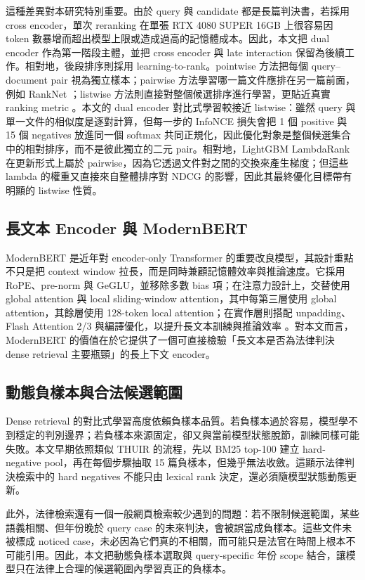 這種差異對本研究特別重要。由於 query 與 candidate 都是長篇判決書，若採用 cross encoder，單次 reranking 在單張 RTX 4080 SUPER 16GB 上很容易因 token 數暴增而超出模型上限或造成過高的記憶體成本。因此，本文把 dual encoder 作為第一階段主體，並把 cross encoder 與 late interaction 保留為後續工作。相對地，後段排序則採用 learning-to-rank。pointwise 方法把每個 query--document pair 視為獨立樣本；pairwise 方法學習哪一篇文件應排在另一篇前面，例如 RankNet \cite{burges2005ranknet}；listwise 方法則直接對整個候選排序進行學習，更貼近真實 ranking metric \cite{cao2007listnet,liu2009ltr}。本文的 dual encoder 對比式學習較接近 listwise：雖然 query 與單一文件的相似度是逐對計算，但每一步的 InfoNCE 損失會把 1 個 positive 與 15 個 negatives 放進同一個 softmax 共同正規化，因此優化對象是整個候選集合中的相對排序，而不是彼此獨立的二元 pair。相對地，LightGBM LambdaRank 在更新形式上屬於 pairwise，因為它透過文件對之間的交換來產生梯度；但這些 lambda 的權重又直接來自整體排序對 NDCG 的影響，因此其最終優化目標帶有明顯的 listwise 性質。

\subsection{長文本 Encoder 與 ModernBERT}

ModernBERT \cite{warner2024modernbert} 是近年對 encoder-only Transformer 的重要改良模型，其設計重點不只是把 context window 拉長，而是同時兼顧記憶體效率與推論速度。它採用 RoPE、pre-norm 與 GeGLU，並移除多數 bias 項；在注意力設計上，交替使用 global attention 與 local sliding-window attention，其中每第三層使用 global attention，其餘層使用 128-token local attention；在實作層則搭配 unpadding、Flash Attention 2/3 與編譯優化，以提升長文本訓練與推論效率 \cite{warner2024modernbert}。對本文而言，ModernBERT 的價值在於它提供了一個可直接檢驗「長文本是否為法律判決 dense retrieval 主要瓶頸」的長上下文 encoder。

\subsection{動態負樣本與合法候選範圍}

Dense retrieval 的對比式學習高度依賴負樣本品質。若負樣本過於容易，模型學不到穩定的判別邊界；若負樣本來源固定，卻又與當前模型狀態脫節，訓練同樣可能失敗。本文早期依照類似 THUIR 的流程，先以 BM25 top-100 建立 hard-negative pool，再在每個步驟抽取 15 篇負樣本，但幾乎無法收斂。這顯示法律判決檢索中的 hard negatives 不能只由 lexical rank 決定，還必須隨模型狀態動態更新。

此外，法律檢索還有一個一般網頁檢索較少遇到的問題：若不限制候選範圍，某些語義相關、但年份晚於 query case 的未來判決，會被誤當成負樣本。這些文件未被標成 noticed case，未必因為它們真的不相關，而可能只是法官在時間上根本不可能引用。因此，本文把動態負樣本選取與 query-specific 年份 scope 結合，讓模型只在法律上合理的候選範圍內學習真正的負樣本。
